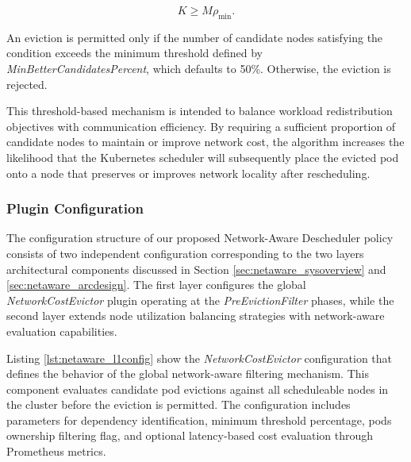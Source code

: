\[
K \geq M \rho_{\min}.
\]

An eviction is permitted only if the number of candidate nodes satisfying the condition exceeds the minimum threshold defined by \textit{MinBetterCandidatesPercent}, which defaults to 50\%. Otherwise, the eviction is rejected.

This threshold-based mechanism is intended to balance workload redistribution objectives with communication efficiency. By requiring a sufficient proportion of candidate nodes to maintain or improve network cost, the algorithm increases the likelihood that the Kubernetes scheduler will subsequently place the evicted pod onto a node that preserves or improves network locality after rescheduling.

\subsubsection{Plugin Configuration}
\label{sec:netaware_config}
The configuration structure of our proposed Network-Aware Descheduler policy consists of two independent configuration corresponding to the two layers architectural components discussed in Section \ref{sec:netaware_sysoverview} and \ref{sec:netaware_arcdesign}. The first layer configures the global \textit{NetworkCostEvictor} plugin operating at the \textit{PreEvictionFilter} phases, while the second layer extends node utilization balancing strategies with network-aware evaluation capabilities.

\begin{figure}[tbp]
    \centering
    \begin{minipage}{0.95\textwidth}
    
    \end{minipage}
\end{figure}

Listing \ref{lst:netaware_l1config} show the \textit{NetworkCostEvictor} configuration that defines the behavior of the global network-aware filtering mechanism. This component evaluates candidate pod evictions against all scheduleable nodes in the cluster before the eviction is permitted. The configuration includes parameters for dependency identification, minimum threshold percentage, pods ownership filtering flag, and optional latency-based cost evaluation through Prometheus metrics.

